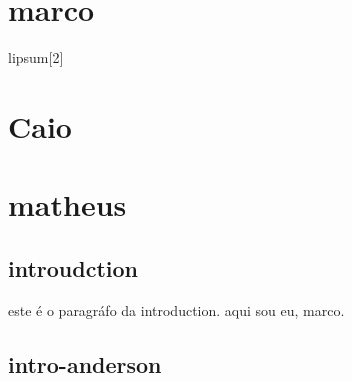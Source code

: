 
    \section{marco}
    lipsum[2]
    \section{Caio}
    \section{matheus}

    \subsection{introudction}
    este é o paragráfo da introduction.
    aqui sou eu, marco.

    \subsection{intro-anderson}

    
    



